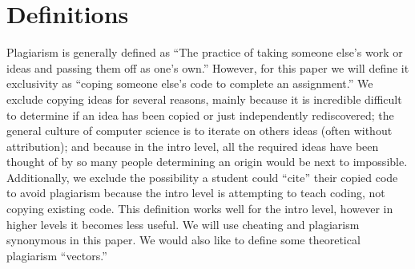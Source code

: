 \documentclass[letterpaper,10pt,conference]{IEEEtran}
\begin{document}
\section{Definitions}
Plagiarism is generally defined as ``The practice of taking someone else's work or ideas and passing them off as one's own.''\cite{oxed}  However, for this paper we will define it exclusivity as ``coping someone else's code to complete an assignment.''  We exclude copying ideas for several reasons, mainly because it is incredible difficult to determine if an idea has been copied or just independently rediscovered; the general culture of computer science is to iterate on others ideas (often without attribution); and because in the intro level, all the required ideas have been thought of by so many people determining an origin would be next to impossible.  Additionally, we exclude the possibility a student could ``cite'' their copied code to avoid plagiarism because the intro level is attempting to teach coding, not copying existing code.  This definition works well for the intro level, however in higher levels it becomes less useful.  We will use cheating and plagiarism synonymous in this paper.  We would also like to define some theoretical plagiarism ``vectors.''
\end{document}

